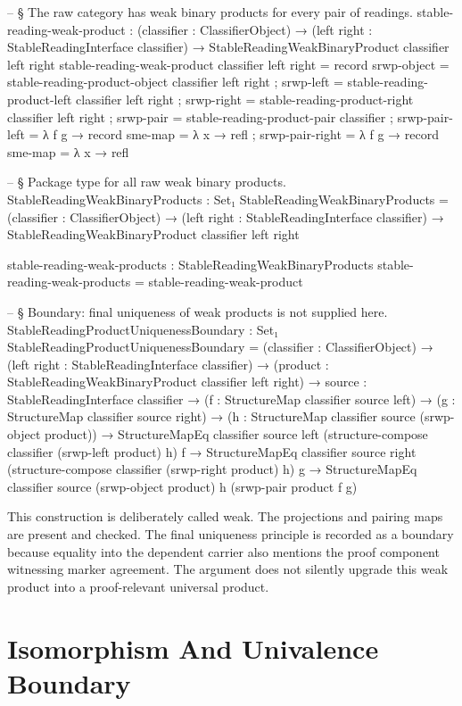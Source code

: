 \documentclass[11pt]{article}
\begin{document}
\begin{code}
-- § The raw category has weak binary products for every pair of readings.
stable-reading-weak-product :
  (classifier : ClassifierObject) →
  (left right : StableReadingInterface classifier) →
  StableReadingWeakBinaryProduct classifier left right
stable-reading-weak-product classifier left right = record
  { srwp-object = stable-reading-product-object classifier left right
  ; srwp-left = stable-reading-product-left classifier left right
  ; srwp-right = stable-reading-product-right classifier left right
  ; srwp-pair = stable-reading-product-pair classifier
  ; srwp-pair-left = λ f g → record { sme-map = λ x → refl }
  ; srwp-pair-right = λ f g → record { sme-map = λ x → refl }
  }

-- § Package type for all raw weak binary products.
StableReadingWeakBinaryProducts : Set₁
StableReadingWeakBinaryProducts =
  (classifier : ClassifierObject) →
  (left right : StableReadingInterface classifier) →
  StableReadingWeakBinaryProduct classifier left right

stable-reading-weak-products : StableReadingWeakBinaryProducts
stable-reading-weak-products = stable-reading-weak-product

-- § Boundary: final uniqueness of weak products is not supplied here.
StableReadingProductUniquenessBoundary : Set₁
StableReadingProductUniquenessBoundary =
  (classifier : ClassifierObject) →
  (left right : StableReadingInterface classifier) →
  (product : StableReadingWeakBinaryProduct classifier left right) →
  {source : StableReadingInterface classifier} →
  (f : StructureMap classifier source left) →
  (g : StructureMap classifier source right) →
  (h : StructureMap classifier source (srwp-object product)) →
  StructureMapEq classifier source left
    (structure-compose classifier (srwp-left product) h) f →
  StructureMapEq classifier source right
    (structure-compose classifier (srwp-right product) h) g →
  StructureMapEq classifier source (srwp-object product) h (srwp-pair product f g)
\end{code}

This construction is deliberately called weak.  The projections and
pairing maps are present and checked.  The final uniqueness principle is
recorded as a boundary because equality into the dependent carrier also
mentions the proof component witnessing marker agreement.  The argument does
not silently upgrade this weak product into a proof-relevant universal
product.

\section{Isomorphism And Univalence Boundary}
\end{document}
